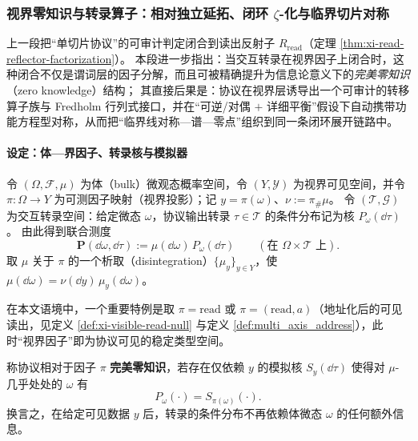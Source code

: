 \subsubsection{视界零知识与转录算子：相对独立延拓、闭环 \texorpdfstring{$\zeta$}{zeta}-化与临界切片对称}\label{subsubsec:xi-horizon-zero-knowledge-operator-model}
上一段把“单切片协议”的可审计判定闭合到读出反射子 \(R_{\mathrm{read}}\)（定理 \ref{thm:xi-read-reflector-factorization}）。
本段进一步指出：当交互转录在视界因子上闭合时，这种闭合不仅是谓词层的因子分解，而且可被精确提升为信息论意义下的\emph{完美零知识}（zero knowledge）结构；
其直接后果是：协议在视界层诱导出一个可审计的转移算子族与 Fredholm 行列式接口，并在“可逆/对偶 \(+\) 详细平衡”假设下自动携带功能方程型对称，从而把“临界线对称—谱—零点”组织到同一条闭环展开链路中。
\par

\paragraph{设定：体—界因子、转录核与模拟器}
令 \((\Omega,\mathcal{F},\mu)\) 为体（bulk）微观态概率空间，令 \((Y,\mathcal{Y})\) 为视界可见空间，并令 \(\pi:\Omega\to Y\) 为可测因子映射（视界投影）；记 \(y=\pi(\omega)\)、\(\nu:=\pi_{\#}\mu\)。
令 \((\mathcal{T},\mathcal{G})\) 为交互转录空间：给定微态 \(\omega\)，协议输出转录 \(\tau\in\mathcal{T}\) 的条件分布记为核 \(P_{\omega}(\dd\tau)\)。
由此得到联合测度
\[
\mathbf{P}(\dd\omega,\dd\tau):=\mu(\dd\omega)\,P_{\omega}(\dd\tau)
\qquad(\text{在 }\Omega\times\mathcal{T}\text{ 上}).
\]
取 \(\mu\) 关于 \(\pi\) 的一个析取（disintegration）\(\{\mu_y\}_{y\in Y}\)，使 \(\mu(\dd\omega)=\nu(\dd y)\,\mu_y(\dd\omega)\)。
\par
在本文语境中，一个重要特例是取 \(\pi=\mathrm{read}\) 或 \(\pi=(\mathrm{read},a)\)（地址化后的可见读出，见定义 \ref{def:xi-visible-read-null} 与定义 \ref{def:multi_axis_address}），此时“视界因子”即为协议可见的稳定类型空间。

\begin{definition}[视界因子上的完美零知识]\label{def:xi-horizon-perfect-zero-knowledge}
称协议相对于因子 \(\pi\) \textbf{完美零知识}，若存在仅依赖 \(y\) 的模拟核 \(S_y(\dd\tau)\) 使得对 \(\mu\)-几乎处处的 \(\omega\) 有
\[
P_{\omega}(\cdot)=S_{\pi(\omega)}(\cdot).
\]
换言之，在给定可见数据 \(y\) 后，转录的条件分布不再依赖体微态 \(\omega\) 的任何额外信息。
\end{definition}

